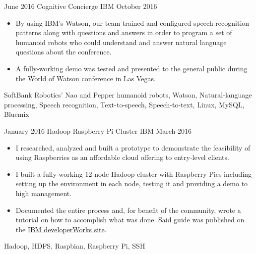 \begin{projects}
    \project
        {June 2016}
        {Cognitive Concierge}
        {IBM}
        {October 2016}
        {
            \begin{itemize}
                \item By using IBM's Watson, our team trained and configured 
                    speech recognition patterns along with questions and 
                    answers in order to program a set of humanoid robots who 
                    could understand and answer natural language questions 
                    about the conference.
                \item A fully-working demo was tested and presented to the 
                    general public during the World of Watson conference in Las 
                    Vegas.
            \end{itemize}
        }
        {
            SoftBank Robotics' Nao and Pepper humanoid robots,
            Watson,
            Natural-language processing,
            Speech recognition,
            Text-to-speech,
            Speech-to-text,
            Linux,
            MySQL,
            Bluemix
        }

    \emptySeparator

    \project
        {January 2016}
        {Hadoop Raspberry Pi Cluster}
        {IBM}
        {March 2016}
        {
            \begin{itemize}
                \item I researched, analyzed and built a prototype to 
                    demonstrate the feasibility of using Raspberries as an 
                    affordable cloud offering to entry-level clients.
                \item I built a fully-working 12-node Hadoop cluster with 
                    Raspberry Pies including setting up the environment in each 
                    node, testing it and providing a demo to high management.
                \item Documented the entire process and, for benefit of the 
                    community, wrote a tutorial on how to accomplish what was 
                    done. Said guide was published on the 
                    \href{https://developer.ibm.com/recipes/tutorials/building-a-hadoop-cluster-with-raspberry-pi/}
                    {IBM developerWorks site}.
            \end{itemize}
        }
        {
            Hadoop,
            HDFS,
            Raspbian,
            Raspberry Pi,
            SSH
        }


\end{projects}
